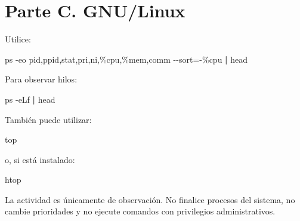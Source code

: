 \documentclass[
  spanish,
  letterpaper,
]{scrbook}
\newenvironment{Shaded}{\begin{snugshade}}{\end{snugshade}}
\newcommand{\AttributeTok}[1]{\textcolor[rgb]{0.40,0.45,0.13}{#1}}
\newcommand{\ExtensionTok}[1]{\textcolor[rgb]{0.00,0.23,0.31}{#1}}
\newcommand{\FunctionTok}[1]{\textcolor[rgb]{0.28,0.35,0.67}{#1}}
\newcommand{\KeywordTok}[1]{\textcolor[rgb]{0.00,0.23,0.31}{\textbf{#1}}}
\newcommand{\NormalTok}[1]{\textcolor[rgb]{0.00,0.23,0.31}{#1}}
\newcommand{\OperatorTok}[1]{\textcolor[rgb]{0.37,0.37,0.37}{#1}}
\begin{document}
\section{Parte C. GNU/Linux}\label{parte-c.-gnulinux}

Utilice:

\begin{Shaded}
\begin{Highlighting}[]
\FunctionTok{ps} \AttributeTok{{-}eo}\NormalTok{ pid,ppid,stat,pri,ni,\%cpu,\%mem,comm }\AttributeTok{{-}{-}sort}\OperatorTok{=}\NormalTok{{-}\%cpu }\KeywordTok{|} \FunctionTok{head}
\end{Highlighting}
\end{Shaded}

Para observar hilos:

\begin{Shaded}
\begin{Highlighting}[]
\FunctionTok{ps} \AttributeTok{{-}eLf} \KeywordTok{|} \FunctionTok{head}
\end{Highlighting}
\end{Shaded}

También puede utilizar:

\begin{Shaded}
\begin{Highlighting}[]
\ExtensionTok{top}
\end{Highlighting}
\end{Shaded}

o, si está instalado:

\begin{Shaded}
\begin{Highlighting}[]
\ExtensionTok{htop}
\end{Highlighting}
\end{Shaded}

\begin{tcolorbox}[enhanced jigsaw, arc=.35mm, bottomrule=.15mm, bottomtitle=1mm, breakable, colback=white, colbacktitle=quarto-callout-warning-color!10!white, colframe=quarto-callout-warning-color-frame, coltitle=black, left=2mm, leftrule=.75mm, opacityback=0, opacitybacktitle=0.6, rightrule=.15mm, title=\textcolor{quarto-callout-warning-color}{\faExclamationTriangle}\hspace{0.5em}{Regla de seguridad del laboratorio}, titlerule=0mm, toprule=.15mm, toptitle=1mm]

La actividad es únicamente de observación. No finalice procesos del
sistema, no cambie prioridades y no ejecute comandos con privilegios
administrativos.

\end{tcolorbox}
\end{document}

